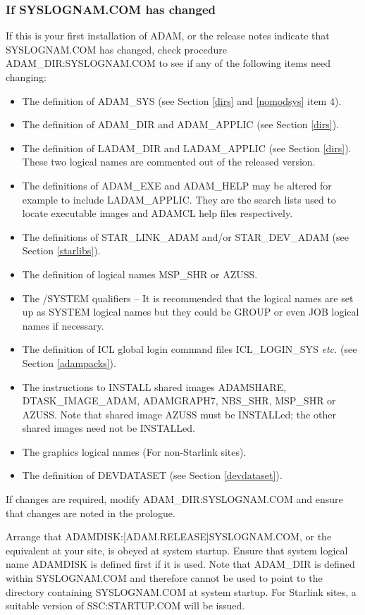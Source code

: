\subsubsection{If SYSLOGNAM.COM has changed}
\label{modsys}
If this is your first installation of ADAM, or the release notes indicate that
SYS\-LOGNAM\-.COM has changed, check procedure ADAM\_DIR:\-SYS\-LOG\-NAM.\-COM
to see if any of the following items need changing:
\begin{itemize}
\item The definition of ADAM\_SYS (see Section \ref{dirs} and \ref{nomodsys}
item 4).
\item The definition of ADAM\_DIR and ADAM\_APPLIC (see Section \ref{dirs}).
\item The definition of LADAM\_DIR and LADAM\_APPLIC (see Section \ref{dirs}).
These two logical names are commented out of the released version.
\item The definitions of ADAM\_EXE and ADAM\_HELP may be altered for example
to include LADAM\-\_APP\-LIC. They are the search lists used to locate
executable images and ADAMCL help files respectively.
\item The definitions of STAR\_LINK\_ADAM and/or STAR\_DEV\_ADAM (see Section
\ref{starlibs}).
\item The definition of logical names MSP\_SHR or AZUSS.
\item The /SYSTEM qualifiers --
It is recommended that the logical names are set up as SYSTEM logical names
but they could be GROUP or even JOB logical names if necessary.
\item The definition of ICL global login command files ICL\-\_LOGIN\-\_SYS
{\em etc.} (see Section \ref{adampacks}).
\item The instructions to INSTALL shared images ADAMSHARE,
DTASK\-\_IMAGE\-\_ADAM, ADAMGRAPH7, NBS\-\_SHR, MSP\-\_SHR or AZUSS.
Note that shared image AZUSS must be INSTALLed; the other shared
images need not be INSTALLed.
\item The graphics logical names (For non-Starlink sites).
\item The definition of DEVDATASET (see Section \ref{devdataset}).
\end{itemize}

If changes are required, modify ADAM\_DIR:SYSLOGNAM.COM and ensure that
changes are noted in the prologue.

Arrange that ADAMDISK:[ADAM.RELEASE]SYSLOGNAM.COM, or the equivalent at your
site, is obeyed at system startup.
Ensure that system logical name ADAMDISK is defined first if it is used.
Note that ADAM\_DIR is defined within SYSLOGNAM.COM and therefore cannot be used
to point to the directory containing SYSLOGNAM.COM at system startup.
For Starlink sites, a suitable version of SSC:STARTUP.COM will be issued.

